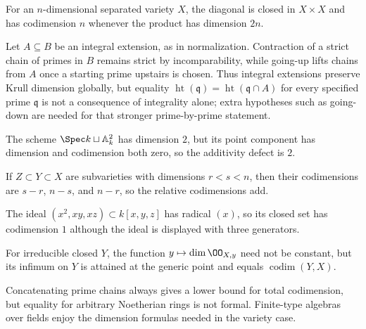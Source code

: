 \begin{example}\label{ex:vi31-adv-08}
For an $n$-dimensional separated variety $X$, the diagonal is closed in $X\times X$ and has codimension $n$ whenever the product has dimension $2n$.
\end{example}

\begin{example}\label{ex:vi31-adv-09}
Let $A\subseteq B$ be an integral extension, as in normalization. Contraction of a strict chain of primes in $B$ remains strict by incomparability, while going-up lifts chains from $A$ once a starting prime upstairs is chosen. Thus integral extensions preserve Krull dimension globally, but equality $\operatorname{ht}(\mathfrak q)=\operatorname{ht}(\mathfrak q\cap A)$ for every specified prime $\mathfrak q$ is not a consequence of integrality alone; extra hypotheses such as going-down are needed for that stronger prime-by-prime statement.
\end{example}

\begin{example}\label{ex:vi31-adv-10}
The scheme $\Spec k\sqcup\mathbb A^2_k$ has dimension $2$, but its point component has dimension and codimension both zero, so the additivity defect is $2$.
\end{example}

\begin{example}\label{ex:vi31-adv-11}
If $Z\subset Y\subset X$ are subvarieties with dimensions $r<s<n$, then their codimensions are $s-r$, $n-s$, and $n-r$, so the relative codimensions add.
\end{example}

\begin{example}\label{ex:vi31-adv-12}
The ideal $(x^2,xy,xz)\subset k[x,y,z]$ has radical $(x)$, so its closed set has codimension $1$ although the ideal is displayed with three generators.
\end{example}

\begin{example}\label{ex:vi31-adv-13}
For irreducible closed $Y$, the function $y\mapsto\dim\OO_{X,y}$ need not be constant, but its infimum on $Y$ is attained at the generic point and equals $\operatorname{codim}(Y,X)$.
\end{example}

\begin{example}\label{ex:vi31-adv-14}
Concatenating prime chains always gives a lower bound for total codimension, but equality for arbitrary Noetherian rings is not formal. Finite-type algebras over fields enjoy the dimension formulas needed in the variety case.
\end{example}